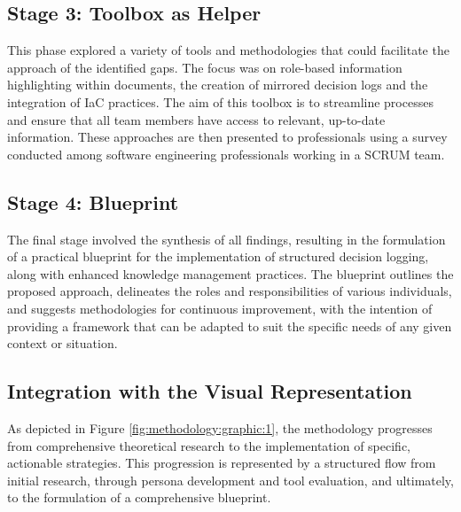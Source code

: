 \subsection*{Stage 3: Toolbox as Helper}
This phase explored a variety of tools and methodologies that could facilitate the approach of the identified gaps. The focus was on role-based information highlighting within documents, the creation of mirrored decision logs and the integration of \ac{IaC} practices. The aim of this toolbox is to streamline processes and ensure that all team members have access to relevant, up-to-date information. These approaches are then presented to professionals using a survey conducted among software engineering professionals working in a \ac{SCRUM} team.

\subsection*{Stage 4: Blueprint}
The final stage involved the synthesis of all findings, resulting in the formulation of a practical blueprint for the implementation of structured decision logging, along with enhanced knowledge management practices. The blueprint outlines the proposed approach, delineates the roles and responsibilities of various individuals, and suggests methodologies for continuous improvement, with the intention of providing a framework that can be adapted to suit the specific needs of any given context or situation.

\subsection*{Integration with the Visual Representation}

As depicted in Figure \ref{fig:methodology:graphic:1}, the methodology progresses from comprehensive theoretical research to the implementation of specific, actionable strategies. This progression is represented by a structured flow from initial research, through persona development and tool evaluation, and ultimately, to the formulation of a comprehensive blueprint.






